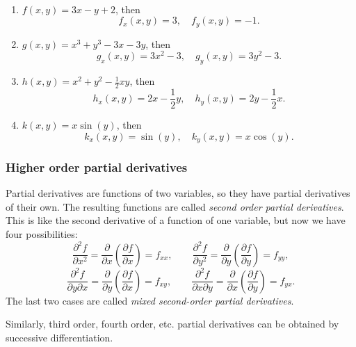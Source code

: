   \begin{examples}
  \
    \begin{enumerate}
      \item $f(x, y) = 3x - y + 2$, then
        \[
          f_x(x, y) = 3, \quad f_y(x, y) = -1.
        \]
      \item $g(x, y) = x^3 + y^3 - 3x - 3y$, then
        \[
          g_x(x, y) = 3x^2 - 3, \quad g_y(x, y) = 3y^2 - 3.
        \]
      \item $h(x, y) = x^2 + y^2 - \frac{1}{2}xy$, then
        \[
          h_x(x, y) = 2x - \frac{1}{2}y, \quad h_y(x, y) = 2y - \frac{1}{2}x.
        \]
      \item $k(x, y) = x\sin(y)$, then
        \[
          k_x(x, y) = \sin(y), \quad k_y(x, y) = x\cos(y).
        \]
    \end{enumerate}
  \end{examples}

  \subsubsection*{Higher order partial derivatives}

  Partial derivatives are functions of two variables, so they have partial derivatives of their own.  The resulting functions are called \emph{second order partial derivatives}.  This is like the second derivative of a function of one variable, but now we have four possibilities:
    \[
      \frac{\partial^2 f}{\partial x^2} = \frac{\partial}{\partial x} \left( \frac{\partial f}{\partial x} \right) = f_{xx}, \quad\quad \frac{\partial^2 f}{\partial y^2} = \frac{\partial}{\partial y} \left( \frac{\partial f}{\partial y} \right) = f_{yy},
    \]
    \[
      \frac{\partial^2 f}{\partial y \partial x} = \frac{\partial}{\partial y} \left( \frac{\partial f}{\partial x} \right) = f_{xy}, \quad\quad \frac{\partial^2 f}{\partial x \partial y} = \frac{\partial}{\partial x} \left( \frac{\partial f}{\partial y} \right) = f_{yx}.
    \]
  The last two cases are called \emph{mixed second-order partial derivatives}.

  Similarly, third order, fourth order, etc. partial derivatives can be obtained by successive differentiation.

